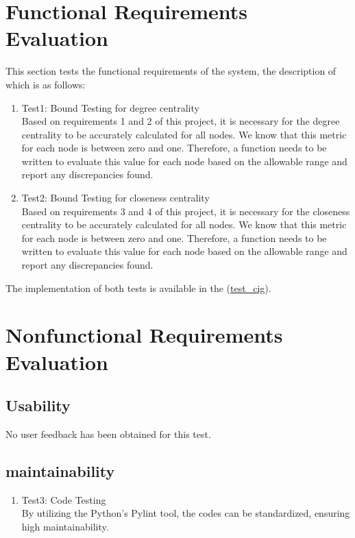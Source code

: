 \documentclass[12pt, titlepage]{article}
\begin{document}
\section{Functional Requirements Evaluation}
This section tests the functional requirements of the system, the description of which is as follows:
\begin{enumerate}
\item{Test1: Bound Testing for degree centrality\\}	
Based on requirements 1 and 2 of this project, it is necessary for the degree centrality to be accurately calculated for all nodes. We know that this metric for each node is between zero and one. Therefore, a function needs to be written to evaluate this value for each node based on the allowable range and report any discrepancies found.
\item{Test2: Bound Testing for closeness centrality\\}
Based on requirements 3 and 4 of this project, it is necessary for the closeness centrality to be accurately calculated for all nodes. We know that this metric for each node is between zero and one. Therefore, a function needs to be written to evaluate this value for each node based on the allowable range and report any discrepancies found.

\end{enumerate}

The implementation of both tests is available in the  (\href{https://github.com/AtiyehSayadi/Centrality-In-Graphs/blob/main/test/test_cig.py}{test\_cig}).
\section{Nonfunctional Requirements Evaluation}

\subsection{Usability}
No user feedback has been obtained for this test.		
\subsection{maintainability}
\begin{enumerate}

\item{Test3: Code Testing\\}
By utilizing the Python's Pylint tool, the codes can be standardized, ensuring high maintainability.
\end{enumerate}
\end{document}
